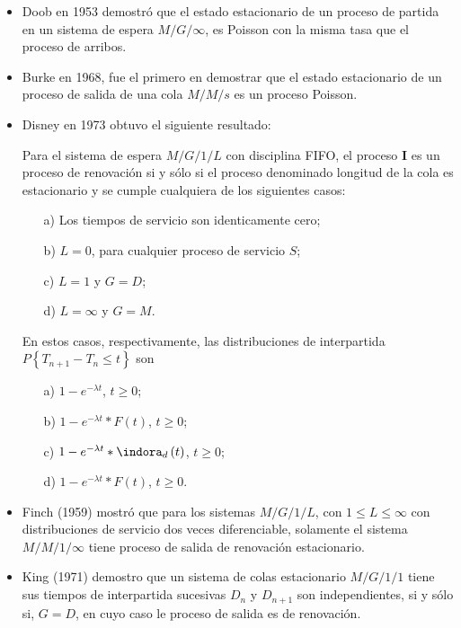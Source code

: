 \begin{itemize}
\item Doob en 1953 demostr\'o que el estado estacionario de un proceso de partida en un sistema de espera $M/G/\infty$, es Poisson con la misma tasa que el proceso de arribos.

\item Burke en 1968, fue el primero en demostrar que el estado estacionario de un proceso de salida de una cola $M/M/s$ es un proceso Poisson.

\item Disney en 1973 obtuvo el siguiente resultado:

\begin{Teo}
Para el sistema de espera $M/G/1/L$ con disciplina FIFO, el proceso $\textbf{I}$ es un proceso de renovaci\'on si y s\'olo si el proceso denominado longitud de la cola es estacionario y se cumple cualquiera de los siguientes casos:

\begin{itemize}
\item[a)] Los tiempos de servicio son identicamente cero;
\item[b)] $L=0$, para cualquier proceso de servicio $S$;
\item[c)] $L=1$ y $G=D$;
\item[d)] $L=\infty$ y $G=M$.
\end{itemize}
En estos casos, respectivamente, las distribuciones de interpartida $P\left\{T_{n+1}-T_{n}\leq t\right\}$ son


\begin{itemize}
\item[a)] $1-e^{-\lambda t}$, $t\geq0$;
\item[b)] $1-e^{-\lambda t}*F\left(t\right)$, $t\geq0$;
\item[c)] $1-e^{-\lambda t}*\indora_{d}\left(t\right)$, $t\geq0$;
\item[d)] $1-e^{-\lambda t}*F\left(t\right)$, $t\geq0$.
\end{itemize}
\end{Teo}


\item Finch (1959) mostr\'o que para los sistemas $M/G/1/L$, con $1\leq L\leq \infty$ con distribuciones de servicio dos veces diferenciable, solamente el sistema $M/M/1/\infty$ tiene proceso de salida de renovaci\'on estacionario.

\item King (1971) demostro que un sistema de colas estacionario $M/G/1/1$ tiene sus tiempos de interpartida sucesivas $D_{n}$ y $D_{n+1}$ son independientes, si y s\'olo si, $G=D$, en cuyo caso le proceso de salida es de renovaci\'on.


\end{itemize}

